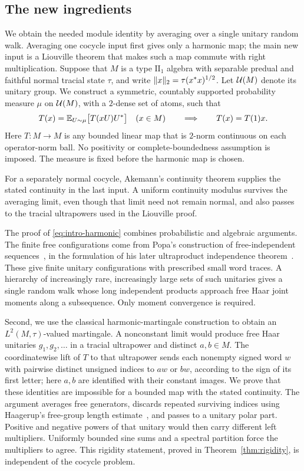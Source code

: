 \subsection{The new ingredients}

We obtain the needed module identity by averaging over a single
unitary random walk. Averaging one cocycle input first gives only a
harmonic map; the main new input is a Liouville theorem that makes
such a map commute with right multiplication.
Suppose that \(M\) is a type \(\mathrm{II}_1\) algebra with separable
predual and faithful normal tracial state \(\tau\), and write
\(\lVert x\rVert_2=\tau(x^*x)^{1/2}\). Let $\mathcal U(M)$ denote its unitary group.
We construct a symmetric, countably supported probability measure
\(\mu\) on \(\mathcal U(M)\), with a \(2\)-dense set of atoms, such that
\begin{equation}\label{eq:intro-harmonic}
T(x)=\mathbb E_{U\sim\mu}\bigl[T(xU)U^*\bigr]
\quad(x\in M)
\qquad\Longrightarrow\qquad
T(x)=T(1)x.
\end{equation}
Here \(T:M\to M\) is any bounded linear map that is \(2\)-norm
continuous on each operator-norm ball. No positivity or
complete-boundedness assumption is imposed.
The measure is fixed before the harmonic map is chosen.

For a separately normal cocycle, Akemann's continuity theorem
\cite[Corollary~III.10]{Akemann1967} supplies the stated continuity in
the last input. A uniform continuity modulus survives the averaging
limit, even though that limit need not remain normal, and also passes
to the tracial ultrapowers used in the Liouville proof.

The proof of \eqref{eq:intro-harmonic} combines probabilistic and
algebraic arguments. The finite free configurations come from Popa's
construction of free-independent sequences~\cite{Popa1995}, in the
formulation of his later ultraproduct independence
theorem~\cite{Popa2014}. These give finite unitary configurations with
prescribed small word traces. A hierarchy of increasingly rare,
increasingly large sets of such unitaries gives a single random walk
whose long independent products approach free Haar joint moments
along a subsequence. Only moment convergence is required.

Second, we use the classical harmonic-martingale construction
\cite[p.~415]{Furstenberg1963} to obtain an \(L^2(M,\tau)\)-valued
martingale. A nonconstant limit would produce free Haar unitaries
\(g_1,g_2,\ldots\) in a tracial ultrapower and distinct \(a,b\in M\).
The coordinatewise lift of \(T\) to that ultrapower sends each
nonempty signed word \(w\) with pairwise distinct unsigned indices
to \(aw\) or \(bw\), according to the sign of its first letter;
here \(a,b\) are identified with their constant images.
We prove that these identities are impossible for a bounded
map with the stated continuity.
The argument averages free generators, discards repeated surviving
indices using Haagerup's free-group length estimate~\cite{Haagerup1979},
and passes to a unitary
polar part. Positive and negative powers of that unitary would then
carry different left multipliers. Uniformly bounded sine sums and a
spectral partition force the multipliers to agree.
This rigidity statement, proved in
Theorem~\ref{thm:rigidity}, is independent of the cocycle problem.

